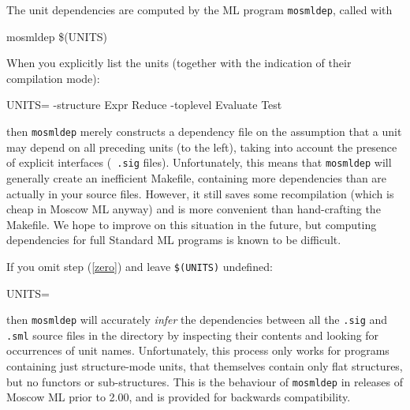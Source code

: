 \documentclass[fleqn,a4paper]{article}
\begin{document}
\noindent The unit dependencies are computed by the ML program
{\tt mosmldep}, called with

\begin{program}
mosmldep \$(UNITS)
\end{program}

\noindent When you explicitly list the units (together with the indication of
their compilation mode):

\begin{program}
UNITS= -structure Expr Reduce -toplevel Evaluate Test
\end{program}

\noindent 
then {\tt mosmldep} merely constructs a dependency file on the
assumption that a unit may depend on all preceding units (to the
left), taking into account the presence of explicit interfaces ({\tt
  .sig} files).  Unfortunately, this means that {\tt mosmldep} will
generally create an inefficient Makefile, containing more dependencies
than are actually in your source files.  However, it still saves some
recompilation (which is cheap in Moscow ML anyway) and is more
convenient than hand-crafting the Makefile.  We hope to improve on
this situation in the future, but computing dependencies for full
Standard ML programs is known to be difficult.

If you omit step (\ref{zero}) and leave {\tt \$(UNITS)} undefined:

\begin{program}
UNITS=
\end{program}

\noindent 
then {\tt mosmldep} will accurately \emph{infer} the dependencies
between all the {\tt .sig} and {\tt .sml} source files in the
directory by inspecting their contents and looking for occurrences
of unit names.  Unfortunately, this process
only works for programs containing just structure-mode units, that
themselves contain only flat structures, but no functors or sub-structures. 
This is the behaviour of {\tt mosmldep} in releases of
Moscow ML prior to 2.00, and is provided for backwards compatibility.


\end{document}
